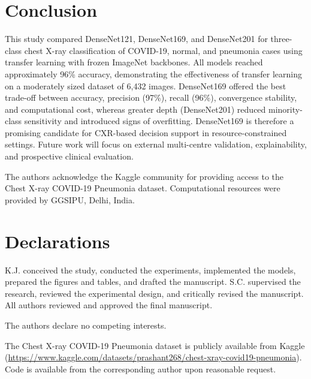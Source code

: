 \documentclass[pdflatex,sn-mathphys-num]{sn-jnl}%
\theoremstyle{thmstyleone}%
\theoremstyle{thmstyletwo}%
\theoremstyle{thmstylethree}%
\begin{document}
\section{Conclusion}
\label{sec:conclusion}

This study compared DenseNet121, DenseNet169, and DenseNet201 for three-class chest X-ray classification of COVID-19, normal, and pneumonia cases using transfer learning with frozen ImageNet backbones. All models reached approximately 96\% accuracy, demonstrating the effectiveness of transfer learning on a moderately sized dataset of 6,432 images. DenseNet169 offered the best trade-off between accuracy, precision (97\%), recall (96\%), convergence stability, and computational cost, whereas greater depth (DenseNet201) reduced minority-class sensitivity and introduced signs of overfitting. DenseNet169 is therefore a promising candidate for CXR-based decision support in resource-constrained settings. Future work will focus on external multi-centre validation, explainability, and prospective clinical evaluation.

\backmatter

The authors acknowledge the Kaggle community for providing access to the Chest X-ray COVID-19 Pneumonia dataset. Computational resources were provided by GGSIPU, Delhi, India.

\section*{Declarations}

K.J. conceived the study, conducted the experiments, implemented the models, prepared the figures and tables, and drafted the manuscript. S.C. supervised the research, reviewed the experimental design, and critically revised the manuscript. All authors reviewed and approved the final manuscript.

The authors declare no competing interests.

The Chest X-ray COVID-19 Pneumonia dataset is publicly available from Kaggle (\url{https://www.kaggle.com/datasets/prashant268/chest-xray-covid19-pneumonia}). Code is available from the corresponding author upon reasonable request.


\end{document}
